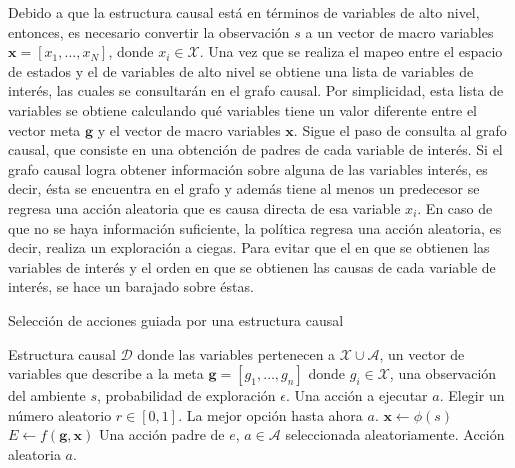 Debido a que la estructura causal está en términos de variables de alto nivel,
entonces, es necesario convertir la observación $s$ a un vector de macro variables $\mathbf{x} = [x_1, \dots, x_N]$, donde $x_i \in \mathcal{X}$. 
Una vez que se
realiza el mapeo entre el espacio de
estados y el de variables de alto nivel se obtiene una lista de variables
de interés, las cuales se consultarán en el grafo causal.
Por simplicidad, esta lista de variables se obtiene calculando
qué variables tiene un valor diferente entre el vector meta $\mathbf{g}$
y el vector de macro variables $\mathbf{x}$.
Sigue el paso de consulta al grafo causal, que consiste en una
obtención de padres de cada variable de interés. Si el grafo causal
logra obtener información sobre alguna de las variables interés, es decir,
ésta se encuentra en el grafo y además tiene al menos un predecesor
se regresa una acción aleatoria que es causa directa de esa variable $x_i$.
En caso de que no se haya información suficiente, la política regresa una acción aleatoria,
es decir, realiza un exploración a ciegas. Para evitar que el  en que
se obtienen las variables de interés y el orden en que se obtienen las causas de 
cada variable de interés, se hace un barajado sobre éstas.

\begin{mialgoritmo}[H]
  \caption{Selección de acciones guiada por una estructura causal \label{alg:guided-action-selection}}
  \begin{algorithmic}[1]
  \REQUIRE Estructura causal $\mathcal{D}$ donde las variables pertenecen a $\mathcal{X} \cup \mathcal{A}$, un vector de variables
  que describe a la meta $\mathbf{g} = [g_1, \dots, g_n]$ donde $g_i \in \mathcal{X}$, una observación del ambiente $s$, probabilidad de exploración $\epsilon$.
  \ENSURE Una acción a ejecutar $a$.
  \STATE Elegir un número aleatorio $r \in [0, 1]$.
    \RETURN La mejor opción hasta ahora $a$.
   \ENDIF
  \STATE $\mathbf{x} \leftarrow \phi(s)$ 
   \STATE $E \leftarrow f(\mathbf{g}, \mathbf{x})$ 
        \RETURN Una acción padre de $e$, $a \in \mathcal{A}$ seleccionada aleatoriamente.
    \ENDIF
    \ENDFOR
    \RETURN Acción aleatoria $a$.
  \end{algorithmic}
\end{mialgoritmo}


